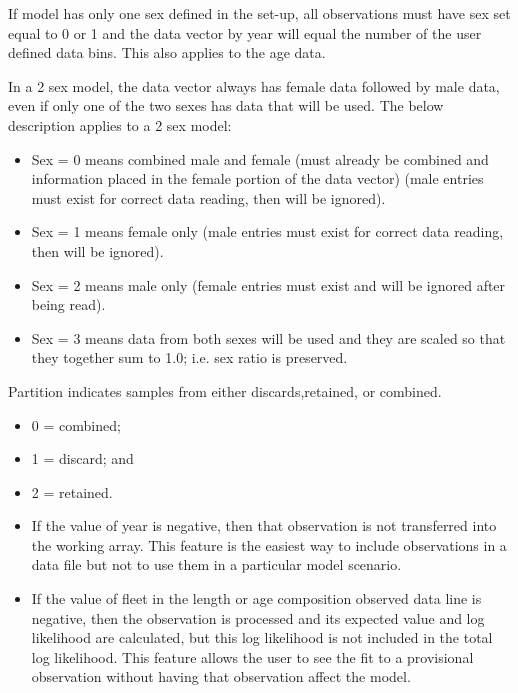If model has only one sex defined in the set-up, all observations must have sex set equal to 0 or 1 and the data vector by year will equal the number of the user defined data bins. This also applies to the age data. 

In a 2 sex model, the data vector always has female data followed by male data, even if only one of the two sexes has data that will be used. The below description applies to a 2 sex model:
	\begin{itemize}
		\item Sex = 0 means combined male and female (must already be combined and information placed in the female portion of the data vector) (male entries must exist for correct data reading, then will be ignored).
		\item Sex = 1 means female only (male entries must exist for correct data reading, then will be ignored).
		\item Sex = 2 means male only (female entries must exist and will be ignored after being read).
		\item Sex = 3 means data from both sexes will be used and they are scaled so that they together sum to 1.0; i.e. sex ratio is preserved.
	\end{itemize}

Partition indicates samples from either discards,retained, or combined.
	\begin{itemize}
		\item 0 = combined;
		\item 1 = discard; and
		\item 2 = retained.
	\end{itemize}

	\begin{itemize}
		\item If the value of year is negative, then that observation is not transferred into the working array. This feature is the easiest way to include observations in a data file but not to use them in a particular model scenario.
		\item If the value of fleet in the length or age composition observed data line is negative, then the observation is processed and its expected value and log likelihood are calculated, but this log likelihood is not included in the total log likelihood. This feature allows the user to see the fit to a provisional observation without having that observation affect the model.
	\end{itemize}

